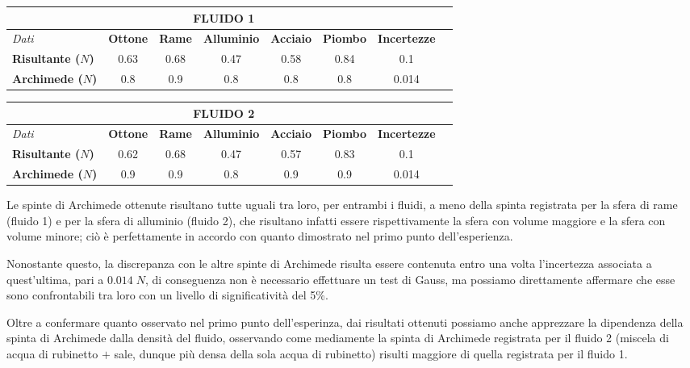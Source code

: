 \documentclass{article}
\begin{document}
\begin{table}[H]
\centering
\renewcommand{\arraystretch}{1.3}
\begin{tabular}{lccccccc}
    \multicolumn{7}{c}{\textbf{FLUIDO 1}} \\
    \toprule
    \textit{Dati} &\textbf{Ottone} &\textbf{Rame} &\textbf{Alluminio} &\textbf{Acciaio} &\textbf{Piombo} &\textbf{Incertezze} \\
    \midrule
    \textbf{Risultante ($N$)} &0.63 &0.68	&0.47 &0.58	&0.84 &0.1\\
    \midrule
    \textbf{Archimede ($N$)} &0.8 &0.9 &0.8 &0.8 &0.8 &0.014\\ 
    \bottomrule
\end{tabular}
\end{table}

\begin{table}[H]
\centering
\renewcommand{\arraystretch}{1.3}
\begin{tabular}{lccccccc}
    \multicolumn{7}{c}{\textbf{FLUIDO 2}} \\
    \toprule
    \textit{Dati} &\textbf{Ottone} &\textbf{Rame} &\textbf{Alluminio} &\textbf{Acciaio} &\textbf{Piombo} &\textbf{Incertezze} \\
    \midrule
    \textbf{Risultante ($N$)} &0.62 &0.68	&0.47 &0.57	&0.83 &0.1 \\
    \midrule
    \textbf{Archimede ($N$)} &0.9 &0.9 &0.8 &0.9 &0.9 &0.014\\ 
    \bottomrule
\end{tabular}
\end{table}
\vspace{0.3cm}

Le spinte di Archimede ottenute risultano tutte uguali tra loro, per entrambi i fluidi, a meno della spinta registrata per la sfera di rame (fluido 1) e per la sfera di alluminio (fluido 2), che risultano infatti essere rispettivamente la sfera con volume maggiore e la sfera con volume minore; ciò è perfettamente in accordo con quanto dimostrato nel primo punto dell'esperienza. 

Nonostante questo, la discrepanza con le altre spinte di Archimede risulta essere contenuta entro una volta l'incertezza associata a quest'ultima, pari a $0.014\;N$, di conseguenza non è necessario effettuare un test di Gauss, ma possiamo direttamente affermare che esse sono confrontabili tra loro con un livello di significatività del 5\%. \medskip

Oltre a confermare quanto osservato nel primo punto dell'esperinza, dai risultati ottenuti possiamo anche apprezzare la dipendenza della spinta di Archimede dalla densità del fluido, osservando come mediamente la spinta di Archimede registrata per il fluido 2 (miscela di acqua di rubinetto $+$ sale, dunque più densa della sola acqua di rubinetto) risulti maggiore di quella registrata per il fluido 1.\medskip
\end{document}
